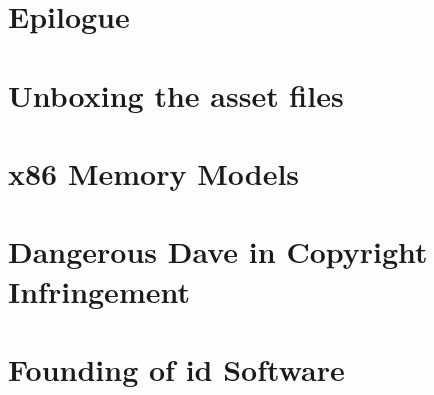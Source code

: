\documentclass[8pt]{book}
\begin{document}
    \chapter{Epilogue}
       
       
    \appendix
    \appendixpage

	\chapter{Unboxing the asset files}
   		    
    
    \chapter{x86 Memory Models}
   		

	\chapter{Dangerous Dave in Copyright Infringement}
        
        
    \chapter{Founding of id Software}
        
  
    \cleartoleftpage
    \thispagestyle{plain} \blankpage
    \thispagestyle{plain} \blankpage
    \thispagestyle{plain} \blankpage
\end{document}
